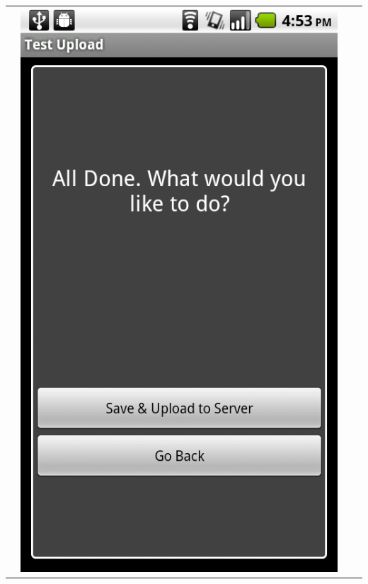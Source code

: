 \documentclass[a4paper,10pt]{article}
\begin{document}
\begin{flushleft}
\begin{tabular}{ c c c c }
&\includegraphics[scale=0.15,keepaspectratio=true]{client_proc_done.png}

\end{tabular}
\end{flushleft}
\end{document}
